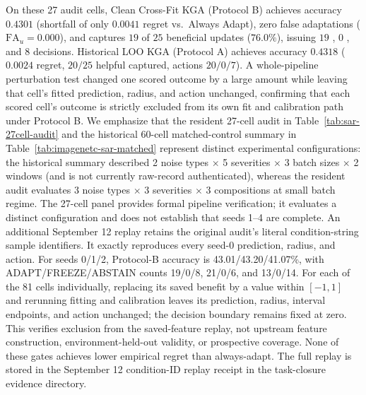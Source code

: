 On these 27 audit cells, Clean Cross-Fit KGA (Protocol B) achieves accuracy $0.4301$ (shortfall of only $0.0041$ regret vs.\ Always Adapt), zero false adaptations ($\mathrm{FA}_u = 0.000$), and captures $19$ of $25$ beneficial updates ($76.0\%$), issuing $19$ \adapt, $0$ \freeze, and $8$ \abstain decisions. Historical LOO KGA (Protocol A) achieves accuracy $0.4318$ ($0.0024$ regret, $20/25$ helpful captured, actions $20/0/7$). A whole-pipeline perturbation test changed one scored outcome by a large amount while leaving that cell's fitted prediction, radius, and action unchanged, confirming that each scored cell's outcome is strictly excluded from its own fit and calibration path under Protocol B.
We emphasize that the resident 27-cell audit in Table~\ref{tab:sar-27cell-audit} and the historical 60-cell matched-control summary in Table~\ref{tab:imagenetc-sar-matched} represent distinct experimental configurations: the historical summary described 2 noise types $\times$ 5 severities $\times$ 3 batch sizes $\times$ 2 windows (and is not currently raw-record authenticated), whereas the resident audit evaluates 3 noise types $\times$ 3 severities $\times$ 3 compositions at small batch regime. The 27-cell panel provides formal pipeline verification; it evaluates a distinct configuration and does not establish that seeds 1--4 are complete.
An additional September 12 replay retains the original audit's literal condition-string
sample identifiers. It exactly reproduces every seed-0 prediction, radius, and action.
For seeds 0/1/2, Protocol-B accuracy is 43.01/43.20/41.07\%, with
ADAPT/FREEZE/ABSTAIN counts 19/0/8, 21/0/6, and 13/0/14. For each of the
81 cells individually, replacing its saved benefit by a value within $[-1,1]$
and rerunning fitting and calibration leaves its prediction, radius, interval
endpoints, and action unchanged; the decision boundary remains fixed at zero.
This verifies exclusion from the saved-feature replay, not upstream feature
construction, environment-held-out validity, or prospective coverage. None of
these gates achieves lower empirical regret than always-adapt. The full replay is stored in the September 12
condition-ID replay receipt in the task-closure evidence directory.

